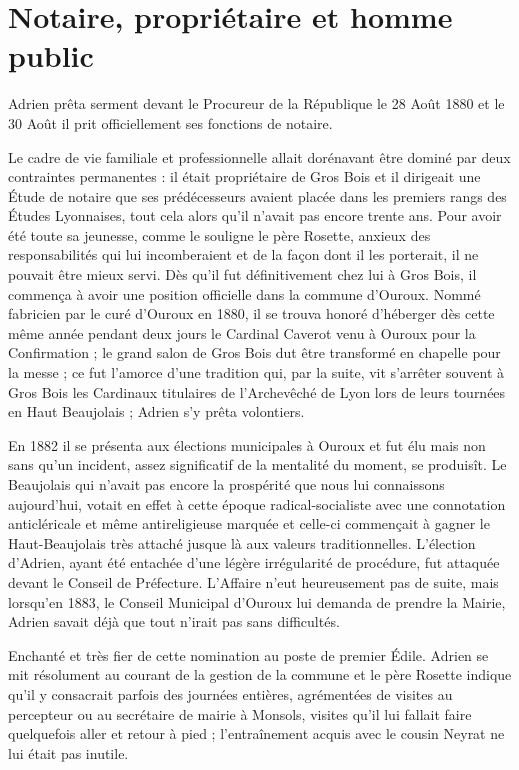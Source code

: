 \documentclass[11pt,a4paper]{report}
\begin{document}
\chapter{Notaire, propriétaire et homme public}\label{notaire-propriuxe9taire-et-homme-public}

Adrien prêta serment devant le Procureur de la République le 28 Août 1880 et le 30 Août il prit officiellement ses fonctions de notaire.

Le cadre de vie familiale et professionnelle allait dorénavant être dominé par deux contraintes permanentes : il était propriétaire de Gros Bois et il dirigeait une Étude de notaire que ses prédécesseurs avaient placée dans les premiers rangs des Études Lyonnaises, tout cela alors qu'il n'avait pas encore trente ans. Pour avoir été toute sa jeunesse, comme le souligne le père Rosette, anxieux des responsabilités qui lui incomberaient et de la façon dont il les porterait, il ne pouvait être mieux servi. Dès qu'il fut définitivement chez lui à Gros Bois, il commença à avoir une position officielle dans la commune d'Ouroux. Nommé fabricien par le curé d'Ouroux en 1880, il se trouva honoré d'héberger dès cette même année pendant deux jours le Cardinal Caverot venu à Ouroux pour la Confirmation ; le grand salon de Gros Bois dut être transformé en chapelle pour la messe ; ce fut l'amorce d'une tradition qui, par la suite, vit s'arrêter souvent à Gros Bois les Cardinaux titulaires de l'Archevêché de Lyon lors de leurs tournées en Haut Beaujolais ; Adrien s'y prêta volontiers.

En 1882 il se présenta aux élections municipales à Ouroux et fut élu mais non sans qu'un incident, assez significatif de la mentalité du moment, se produisît. Le Beaujolais qui n'avait pas encore la prospérité que nous lui connaissons aujourd'hui, votait en effet à cette époque radical-socialiste avec une connotation anticléricale et même antireligieuse marquée et celle-ci commençait à gagner le Haut-Beaujolais très attaché jusque là aux valeurs traditionnelles. L'élection d'Adrien, ayant été entachée d'une légère irrégularité de procédure, fut attaquée devant le Conseil de Préfecture. L'Affaire n'eut heureusement pas de suite, mais lorsqu'en 1883, le Conseil Municipal d'Ouroux lui demanda de prendre la Mairie, Adrien savait déjà que tout n'irait pas sans difficultés.


Enchanté et très fier de cette nomination au poste de premier Édile. Adrien se mit résolument au courant de la gestion de la commune et le père Rosette indique qu'il y consacrait parfois des journées entières, agrémentées de visites au percepteur ou au secrétaire de mairie à Monsols, visites qu'il lui fallait faire quelquefois aller et retour à pied ; l'entraînement acquis avec le cousin Neyrat ne lui était pas inutile.
\end{document}
